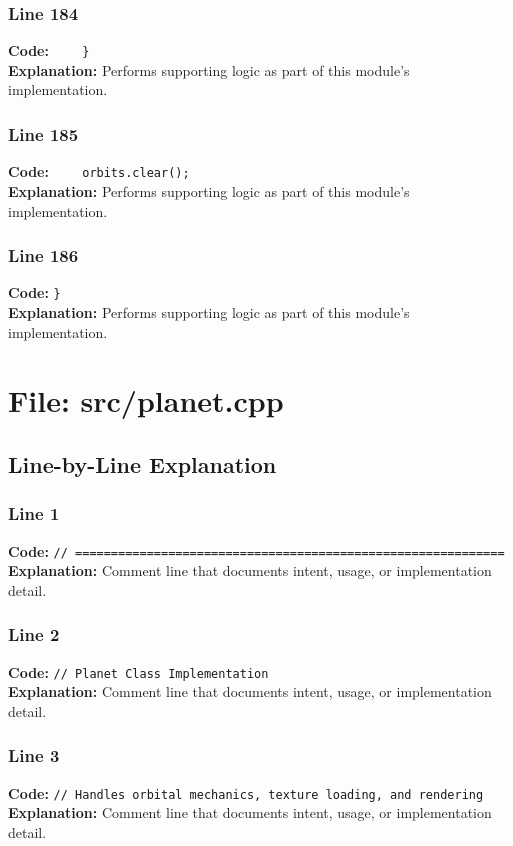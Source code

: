 \documentclass[11pt,a4paper]{article}
\begin{document}
\subsubsection*{Line 184}
\textbf{Code:} \verb|    }|\\
\textbf{Explanation:} Performs supporting logic as part of this module's implementation.

\subsubsection*{Line 185}
\textbf{Code:} \verb|    orbits.clear();|\\
\textbf{Explanation:} Performs supporting logic as part of this module's implementation.

\subsubsection*{Line 186}
\textbf{Code:} \verb|}|\\
\textbf{Explanation:} Performs supporting logic as part of this module's implementation.

\newpage
\section{File: src/planet.cpp}
\subsection{Line-by-Line Explanation}
\subsubsection*{Line 1}
\textbf{Code:} \verb|// ============================================================|\\
\textbf{Explanation:} Comment line that documents intent, usage, or implementation detail.

\subsubsection*{Line 2}
\textbf{Code:} \verb|// Planet Class Implementation|\\
\textbf{Explanation:} Comment line that documents intent, usage, or implementation detail.

\subsubsection*{Line 3}
\textbf{Code:} \verb|// Handles orbital mechanics, texture loading, and rendering|\\
\textbf{Explanation:} Comment line that documents intent, usage, or implementation detail.
\end{document}

